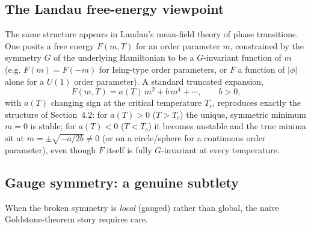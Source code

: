 \subsection{The Landau free-energy viewpoint}

The same structure appears in Landau's mean-field theory of phase transitions.
One posits a free energy $F(m,T)$ for an order parameter $m$, constrained by
the symmetry $G$ of the underlying Hamiltonian to be a $G$-invariant function
of $m$ (e.g. $F(m)=F(-m)$ for Ising-type order parameters, or $F$ a function of
$|\phi|$ alone for a $U(1)$ order parameter). A standard truncated expansion,
\[
F(m,T) = a(T)\,m^2 + b\,m^4 + \cdots, \qquad b>0,
\]
with $a(T)$ changing sign at the critical temperature $T_c$, reproduces exactly
the structure of Section~4.2: for $a(T)>0$ ($T>T_c$) the unique, symmetric
minimum $m=0$ is stable; for $a(T)<0$ ($T<T_c$) it becomes unstable and the
true minima sit at $m=\pm\sqrt{-a/2b}\neq0$ (or on a circle/sphere for a
continuous order parameter), even though $F$ itself is fully $G$-invariant at
every temperature.

\subsection{Gauge symmetry: a genuine subtlety}

When the broken symmetry is \emph{local} (gauged) rather than global, the naive Goldstone-theorem story requires care.

